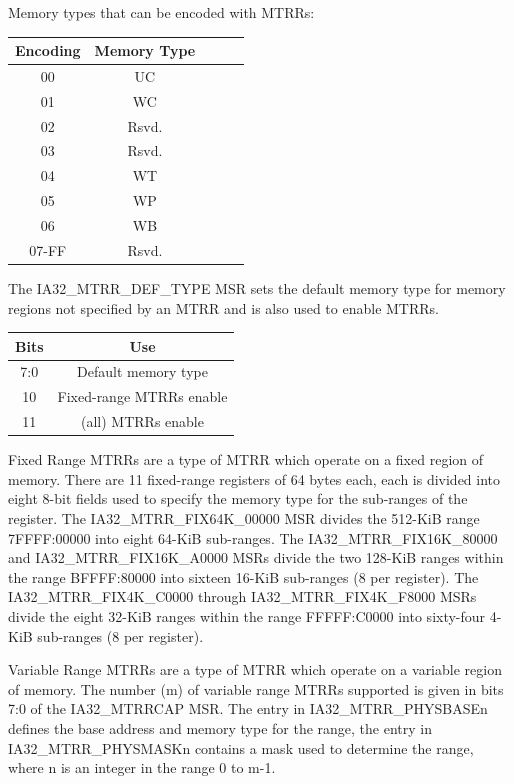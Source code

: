 \documentclass{article}
\newcommand{\layout}[1]{\parbox{\linewidth}{#1}}
\begin{document}
\layout{
  Memory types that can be encoded with MTRRs:
  \begin{table}[H]
    \centering
    \begin{tabular}{|c|c|c|c|c|}
      \hline \textbf{Encoding} & \textbf{Memory Type} \\ \hline
      00 & UC \\
      01 & WC \\
      02 & Rsvd. \\
      03 & Rsvd. \\
      04 & WT \\
      05 & WP \\
      06 & WB \\
      07-FF & Rsvd. \\ \hline
    \end{tabular}
  \end{table}
}

\layout{
  The IA32\_MTRR\_DEF\_TYPE MSR sets the default memory type for memory regions not specified by an MTRR and is also used to enable MTRRs.
  \begin{table}[H]
    \centering
    \begin{tabular}{|c|c|}
      \hline \textbf{Bits} & \textbf{Use} \\ \hline
      7:0 & Default memory type \\
      10 & Fixed-range MTRRs enable \\
      11 & (all) MTRRs enable \\ \hline
    \end{tabular}
  \end{table}
}

\layout{
  Fixed Range MTRRs are a type of MTRR which operate on a fixed region of memory.
  There are 11 fixed-range registers of 64 bytes each, each is divided into eight 8-bit fields used to specify the memory type for the sub-ranges of the register.
  The IA32\_MTRR\_FIX64K\_00000 MSR divides the 512-KiB range 7FFFF:00000 into eight 64-KiB sub-ranges.
  The IA32\_MTRR\_FIX16K\_80000 and IA32\_MTRR\_FIX16K\_A0000 MSRs divide the two 128-KiB ranges within the range BFFFF:80000 into sixteen 16-KiB sub-ranges (8 per register).
  The IA32\_MTRR\_FIX4K\_C0000 through IA32\_MTRR\_FIX4K\_F8000 MSRs divide the eight 32-KiB ranges within the range FFFFF:C0000 into sixty-four 4-KiB sub-ranges (8 per register).
} \bigskip

\layout{
  Variable Range MTRRs are a type of MTRR which operate on a variable region of memory.
  The number (m) of variable range MTRRs supported is given in bits 7:0 of the IA32\_MTRRCAP MSR.
  The entry in IA32\_MTRR\_PHYSBASEn defines the base address and memory type for the range,
  the entry in IA32\_MTRR\_PHYSMASKn contains a mask used to determine the range,
  where n is an integer in the range 0 to m-1.
} \bigskip
\end{document}
